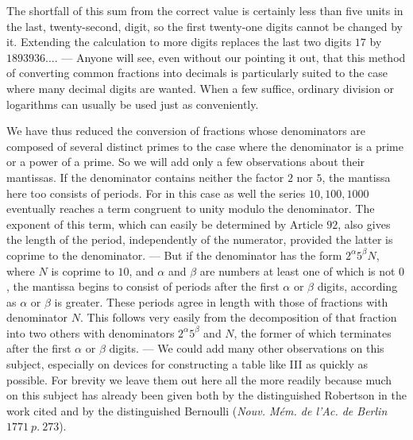 The shortfall of this sum from the correct value is certainly less than five units in the last, twenty-second, digit, so the first twenty-one digits cannot be changed by it. Extending the calculation to more digits replaces the last two digits \(17\) by \(1893936\ldots\). — Anyone will see, even without our pointing it out, that this method of converting common fractions into decimals is particularly suited to the case where many decimal digits are wanted. When a few suffice, ordinary division or logarithms can usually be used just as conveniently.

We have thus reduced the conversion of fractions whose denominators are composed of several distinct primes to the case where the denominator is a prime or a power of a prime. So we will add only a few observations about their mantissas. If the denominator contains neither the factor \(2\) nor \(5\), the mantissa here too consists of periods. For in this case as well the series \(10,\allowbreak 100,\allowbreak 1000\) eventually reaches a term congruent to unity modulo the denominator. The exponent of this term, which can easily be determined by Article \(92\), also gives the length of the period, independently of the numerator, provided the latter is coprime to the denominator. — But if the denominator has the form \(2^\alpha5^\beta N\), where \(N\) is coprime to \(10\), and \(\alpha\) and \(\beta\) are numbers at least one of which is not \(0\), the mantissa begins to consist of periods after the first \(\alpha\) or \(\beta\) digits, according as \(\alpha\) or \(\beta\) is greater. These periods agree in length with those of fractions with denominator \(N\).
This follows very easily from the decomposition of that fraction into two others with denominators \(2^\alpha5^\beta\) and \(N\), the former of which terminates after the first \(\alpha\) or \(\beta\) digits. — We could add many other observations on this subject, especially on devices for constructing a table like III as quickly as possible. For brevity we leave them out here all the more readily because much on this subject has already been given both by the distinguished Robertson in the work cited and by the distinguished Bernoulli (\textit{Nouv. Mém. de l'Ac. de Berlin} \(1771\ p.\ 273\)).

